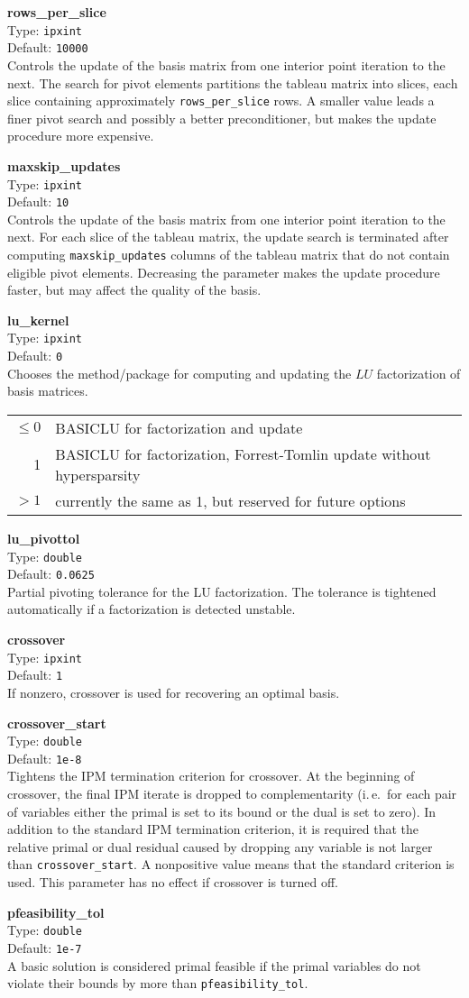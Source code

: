 \documentclass{article}
\newcommand{\ct}{\texttt}
\newcommand{\param}[4]{
  \noindent\begin{minipage}{\textwidth}
    \textbf{#1}\\
    Type: \ct{#2}\\
    Default: \ct{#3}\\
    #4
  \end{minipage}
  \vskip 1\baselineskip
}
\begin{document}
\param{rows\_per\_slice}{ipxint}{10000}{
  Controls the update of the basis matrix from one interior point iteration to
  the next. The search for pivot elements partitions the tableau matrix into
  slices, each slice containing approximately \ct{rows\_per\_slice} rows. A
  smaller value leads a finer pivot search and possibly a better preconditioner,
  but makes the update procedure more expensive.
}

\param{maxskip\_updates}{ipxint}{10}{
  Controls the update of the basis matrix from one interior point iteration to
  the next. For each slice of the tableau matrix, the update search is
  terminated after computing \ct{maxskip\_updates} columns of the tableau matrix
  that do not contain eligible pivot elements. Decreasing the parameter makes
  the update procedure faster, but may affect the quality of the basis.
}

\param{lu\_kernel}{ipxint}{0}{
  Chooses the method/package for computing and updating the $LU$ factorization
  of basis matrices.\\
  \begin{tabular}{rl}
    $\le0$ & BASICLU for factorization and update \\
       1 & BASICLU for factorization, Forrest-Tomlin update without
       hypersparsity \\
       $>1$ & currently the same as 1, but reserved for future options
  \end{tabular}
}

\param{lu\_pivottol}{double}{0.0625}{
  Partial pivoting tolerance for the LU factorization. The tolerance is
  tightened automatically if a factorization is detected unstable.
}

\param{crossover}{ipxint}{1}{
  If nonzero, crossover is used for recovering an optimal basis.
}

\param{crossover\_start}{double}{1e-8}{
  Tightens the IPM termination criterion for crossover. At the beginning of
  crossover, the final IPM iterate is dropped to complementarity (i.\,e.\ for
  each pair of variables either the primal is set to its bound or the dual is
  set to zero). In addition to the standard IPM termination criterion, it is
  required that the relative primal or dual residual caused by dropping any
  variable is not larger than \ct{crossover\_start}. A nonpositive value means
  that the standard criterion is used. This parameter has no effect if crossover
  is turned off.
}

\param{pfeasibility\_tol}{double}{1e-7}{
  A basic solution is considered primal feasible if the primal variables do not
  violate their bounds by more than \ct{pfeasibility\_tol}.
}
\end{document}
